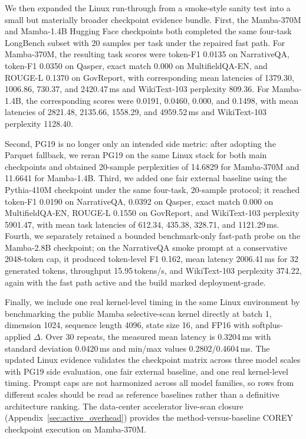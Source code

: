 We then expanded the Linux run-through from a smoke-style sanity test into a small but materially broader checkpoint evidence bundle. First, the Mamba-370M and Mamba-1.4B Hugging Face checkpoints both completed the same four-task LongBench subset with 20 samples per task under the repaired fast path. For Mamba-370M, the resulting task scores were token-F1 0.0135 on NarrativeQA, token-F1 0.0350 on Qasper, exact match 0.000 on MultifieldQA-EN, and ROUGE-L 0.1370 on GovReport, with corresponding mean latencies of 1379.30, 1006.86, 730.37, and 2420.47\,ms and WikiText-103 perplexity 809.36. For Mamba-1.4B, the corresponding scores were 0.0191, 0.0460, 0.000, and 0.1498, with mean latencies of 2821.48, 2135.66, 1558.29, and 4959.52\,ms and WikiText-103 perplexity 1128.40.

Second, PG19 is no longer only an intended side metric: after adopting the Parquet fallback, we reran PG19 on the same Linux stack for both main checkpoints and obtained 20-sample perplexities of 14.6829 for Mamba-370M and 11.6641 for Mamba-1.4B. Third, we added one fair external baseline using the Pythia-410M checkpoint under the same four-task, 20-sample protocol; it reached token-F1 0.0190 on NarrativeQA, 0.0392 on Qasper, exact match 0.000 on MultifieldQA-EN, ROUGE-L 0.1550 on GovReport, and WikiText-103 perplexity 5901.47, with mean task latencies of 612.34, 435.38, 328.71, and 1121.29\,ms. Fourth, we separately retained a bounded benchmark-only fast-path probe on the Mamba-2.8B checkpoint; on the NarrativeQA smoke prompt at a conservative 2048-token cap, it produced token-level F1 0.162, mean latency 2006.41\,ms for 32 generated tokens, throughput 15.95\,tokens/s, and WikiText-103 perplexity 374.22, again with the fast path active and the build marked deployment-grade.

Finally, we include one real kernel-level timing in the same Linux environment by benchmarking the public Mamba selective-scan kernel directly at batch 1, dimension 1024, sequence length 4096, state size 16, and FP16 with softplus-applied $\Delta$. Over 30 repeats, the measured mean latency is 0.3204\,ms with standard deviation 0.0420\,ms and min/max values 0.2802/0.4604\,ms. The updated Linux evidence validates the checkpoint matrix across three model scales with PG19 side evaluation, one fair external baseline, and one real kernel-level timing. Prompt caps are not harmonized across all model families, so rows from different scales should be read as reference baselines rather than a definitive architecture ranking. The data-center accelerator live-scan closure (Appendix~\ref{sec:active_overhead}) provides the method-versus-baseline COREY checkpoint execution on Mamba-370M.


